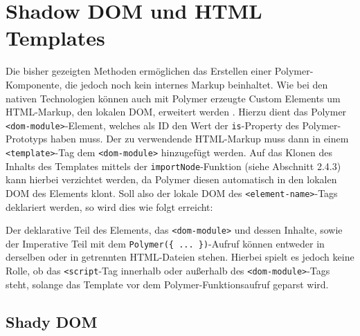 \section{Shadow DOM und HTML Templates}\label{shadow-dom-und-html-templates}

Die bisher gezeigten Methoden ermöglichen das Erstellen einer Polymer-Komponente, die jedoch noch kein internes Markup beinhaltet. Wie bei den nativen Technologien können auch mit Polymer erzeugte Custom Elements um HTML-Markup, den lokalen DOM, erweitert werden \cite{citeulike:13915080}. Hierzu dient das Polymer \texttt{\textless{}dom-module\textgreater{}}-Element, welches als ID den Wert der \texttt{is}-Property des Polymer-Prototyps haben muss. Der zu verwendende HTML-Markup muss dann in einem \texttt{\textless{}template\textgreater{}}-Tag dem \texttt{\textless{}dom-module\textgreater{}} hinzugefügt werden. Auf das Klonen des Inhalts des Templates mittels der \texttt{importNode}-Funktion (siehe Abschnitt 2.4.3) kann hierbei verzichtet werden, da Polymer diesen automatisch in den lokalen DOM des Elements klont. Soll also der lokale DOM des \texttt{\textless{}element-name\textgreater{}}-Tags deklariert werden, so wird dies wie folgt erreicht:

\begin{Shaded}
\begin{Highlighting}[]
\KeywordTok{>}

    \NormalTok{(}\OperatorTok{\{}
      \OperatorTok{:} 
    \OperatorTok{\}}\NormalTok{)}\OperatorTok{;}
  \OperatorTok{<}
\OperatorTok{-}\OperatorTok{>}
\end{Highlighting}
\end{Shaded}

Der deklarative Teil des Elements, das \texttt{\textless{}dom-module\textgreater{}} und dessen Inhalte, sowie der Imperative Teil mit dem \texttt{Polymer(\{\ ...\ \})}-Aufruf können entweder in derselben oder in getrennten HTML-Dateien stehen. Hierbei spielt es jedoch keine Rolle, ob das \texttt{\textless{}script}-Tag innerhalb oder außerhalb des \texttt{\textless{}dom-module\textgreater{}}-Tags steht, solange das Template vor dem Polymer-Funktionsaufruf geparst wird.


\subsection{Shady DOM}\label{shady-dom}

